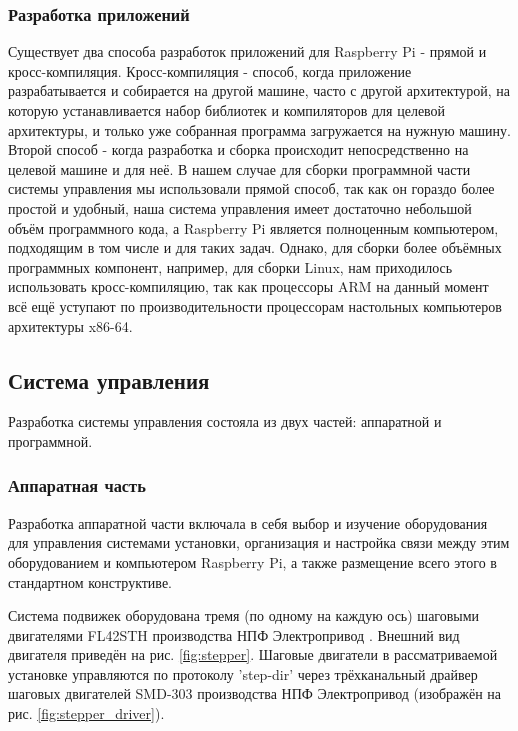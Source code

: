 \documentclass[14pt,russian,a4paper]{extarticle}
\newcounter{subsubsubsection}[subsubsection]
\begin{document}
\subsubsection{Разработка приложений}
Существует два способа разработок приложений для Raspberry Pi - прямой и кросс-компиляция. Кросс-компиляция - способ, когда приложение разрабатывается и собирается на другой машине, часто с другой архитектурой, на которую устанавливается набор библиотек и компиляторов для целевой архитектуры, и только уже собранная программа загружается на нужную машину. Второй способ - когда разработка и сборка происходит непосредственно на целевой машине и для неё. В нашем случае для сборки программной части системы управления мы использовали прямой способ, так как он гораздо более простой и удобный, наша система управления имеет достаточно небольшой объём программного кода, а Raspberry Pi является полноценным компьютером, подходящим в том числе и для таких задач. Однако, для сборки более объёмных программных компонент, например, для сборки Linux, нам приходилось использовать кросс-компиляцию, так как процессоры ARM на данный момент всё ещё уступают по производительности процессорам настольных компьютеров архитектуры x86-64.

\subsection{Система управления}
Разработка системы управления состояла из двух частей: аппаратной и программной.
\subsubsection{Аппаратная часть}
Разработка аппаратной части включала в себя выбор и изучение оборудования для управления системами установки, организация и настройка связи между этим оборудованием и компьютером Raspberry Pi, а также размещение всего этого в стандартном конструктиве.

Система подвижек оборудована тремя (по одному на каждую ось) шаговыми двигателями FL42STH производства НПФ Электропривод \cite{stepper}. Внешний вид двигателя приведён на рис. \ref{fig:stepper}.
\newline
Шаговые двигатели в рассматриваемой установке управляются по протоколу 'step-dir' через трёхканальный драйвер шаговых двигателей SMD-303 производства НПФ Электропривод \cite{stepper_driver} (изображён на рис. \ref{fig:stepper_driver}).
\newline
\end{document}
